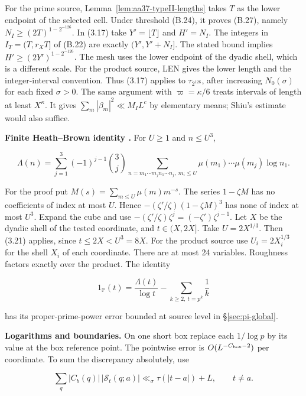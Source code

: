 For the prime source, Lemma~\ref{lem:aa37-typeII-lengths}
takes $T$ as the lower endpoint of the selected cell.
Under threshold (B.24), it proves (B.27), namely
$N_I\ge(2T)^{1-2^{-126}}$.
In (3.17) take $Y'=\lfloor T\rfloor$ and $H'=N_I$.
The integers in $I_T=(T,r_XT]$ of (B.22) are exactly
$(Y',Y'+N_I]$.
The stated bound implies $H'\ge(2Y')^{1-2^{-126}}$.
The mesh uses the lower endpoint of the dyadic shell, which is a different scale.
For the product source, LEN gives the lower length and the integer-interval convention.
Thus (3.17) applies to $\tau_{2^{126}}$, after increasing $N_0(\sigma)$ for each fixed
$\sigma>0$.
The same argument with $\varpi=\kappa/6$ treats
intervals of length at least $X^\kappa$.
It gives $\sum_m|\beta_m|^2\ll M_IL^c$ by elementary means; Shiu's estimate \cite{Shiu80} would also suffice.

\noindent\begin{minipage}{\linewidth}
\textbf{Finite Heath--Brown identity \cite{HB82}.} For $U\ge1$ and $n\le U^3$,

\[
\Lambda(n)=\sum_{j=1}^3(-1)^{j-1}\binom3j
 \sum_{n=m_1\cdots m_jn_1\cdots n_j,\ m_i\le U}
           \mu(m_1)\cdots\mu(m_j)\log n_1.
\tag{3.21}
\]
\end{minipage}

For the proof put $M(s)=\sum_{m\le U}\mu(m)m^{-s}$.
The series $1-\zeta M$ has no coefficients of index at most $U$. Hence
$-(\zeta'/\zeta)(1-\zeta M)^3$ has none of index at most $U^3$.
Expand the cube and use $-(\zeta'/\zeta)\zeta^j=(-\zeta')\zeta^{j-1}$.
Let $X$ be the dyadic shell of the tested coordinate, and $t\in(X,2X]$.
Take $U=2X^{1/3}$. Then (3.21) applies, since $t\le2X<U^3=8X$.
For the product source use $U_i=2X_i^{1/3}$ for the shell $X_i$ of each coordinate.
There are at most 24 variables.
Roughness factors exactly over the product. The identity

\[
1_{\mathbb P}(t)=\frac{\Lambda(t)}{\log t}
               -\sum_{k\ge2,\ t=p^k}\frac1k
\tag{3.22}
\]

\noindent has its proper-prime-power error bounded at source level in \S\ref{sec:pi-global}.

\textbf{Logarithms and boundaries.} On one short box replace each $1/\log p$
by its value at the box reference point. The pointwise error is
$O(L^{-C_{\rm box}-2})$ per coordinate. To sum the discrepancy
absolutely, use

\[
\sum_q|C_b(q)|\,|\mathcal S_t(q;a)|
 \ll_\sigma\tau(|t-a|)+L,\qquad t\ne a.
\tag{3.23}
\]

